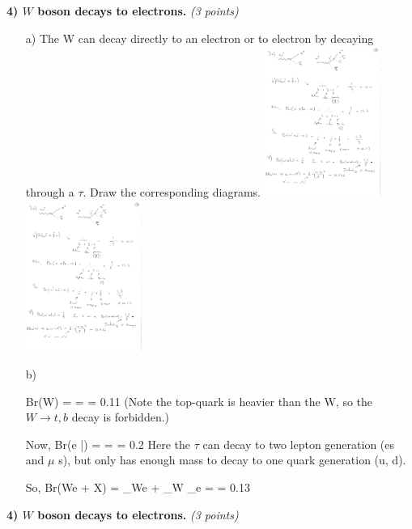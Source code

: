 {\textbf{4)  $W$ boson decays to electrons. } \hfill \textit{(3 points)}\\
\begin{itemize}
\item[a)]{ The W can decay directly to an electron or to electron by decaying through a $\tau$. Draw the corresponding diagrams.
\bc
\includegraphics[width=0.3\textwidth]{./Wenu.pdf}
\includegraphics[width=0.3\textwidth]{./We3nu.pdf}
\ec
}
\item[b)]{ 
\be
Br(W\rightarrow \ell \nu)  =  =  = 0.11
\ee
(Note the top-quark is heavier than the W, so the $W\rightarrow t, b $ decay is forbidden.)

Now,
\be
Br(\tau \rightarrow e \nu \bar{\nu})  =  =  = 0.2
\ee
Here the $\tau$ can decay to two lepton generation (es and $\mu$ s), but only has enough mass to decay to one quark generation (u, d). 


So, 
\be
Br(W\rightarrow e + X) = _{W\rightarrow e\nu} + _{W\rightarrow \tau\nu} \times {}_{\tau\rightarrow e\nu}  =  = 0.13
\ee

}
\end{itemize}           

\textbf{4)  $W$ boson decays to electrons. } \hfill \textit{(3 points)}\\

}

